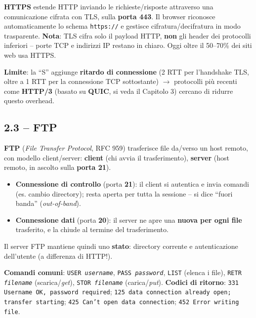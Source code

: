 \documentclass[12pt, a4paper]{article}
\begin{document}
\textbf{HTTPS} estende HTTP inviando le richieste/risposte attraverso una comunicazione cifrata con TLS, sulla \textbf{porta 443}. Il browser riconosce automaticamente lo schema \texttt{https://} e gestisce cifratura/decifratura in modo trasparente. \textbf{Nota}: TLS cifra solo il payload HTTP, \textbf{non} gli header dei protocolli inferiori -- porte TCP e indirizzi IP restano in chiaro. Oggi oltre il 50--70\% dei siti web usa HTTPS.

\textcolor{red!70!black}{\textbf{Limite}}: la ``S'' aggiunge \textbf{ritardo di connessione} (2 RTT per l'handshake TLS, oltre a 1 RTT per la connessione TCP sottostante) $\rightarrow$ protocolli più recenti come \textbf{HTTP/3} (basato su \textbf{QUIC}, si veda il Capitolo 3) cercano di ridurre questo overhead.

\subsection{2.3 -- FTP}

\textbf{FTP} (\textit{File Transfer Protocol}, RFC 959) trasferisce file da/verso un host remoto, con modello client/server: \textbf{client} (chi avvia il trasferimento), \textbf{server} (host remoto, in ascolto sulla \textbf{porta 21}).

\begin{tcolorbox}[colback=lightergray!10, colframe=tocsec, title=\textbf{Due connessioni TCP separate}]
\begin{itemize}
    \item \textbf{Connessione di controllo} (porta \textbf{21}): il client si autentica e invia comandi (es. cambio directory); resta aperta per tutta la sessione -- si dice ``fuori banda'' (\textit{out-of-band}).
    \item \textbf{Connessione dati} (porta \textbf{20}): il server ne apre una \textbf{nuova per ogni file} trasferito, e la chiude al termine del trasferimento.
\end{itemize}
Il server FTP mantiene quindi uno \textbf{stato}: directory corrente e autenticazione dell'utente (a differenza di HTTP!).
\end{tcolorbox}

\textbf{Comandi comuni}: \texttt{USER \textit{username}}, \texttt{PASS \textit{password}}, \texttt{LIST} (elenca i file), \texttt{RETR \textit{filename}} (scarica/\textit{get}), \texttt{STOR \textit{filename}} (carica/\textit{put}). \textbf{Codici di ritorno}: \texttt{331 Username OK, password required}; \texttt{125 data connection already open; transfer starting}; \texttt{425 Can't open data connection}; \texttt{452 Error writing file}.
\end{document}
